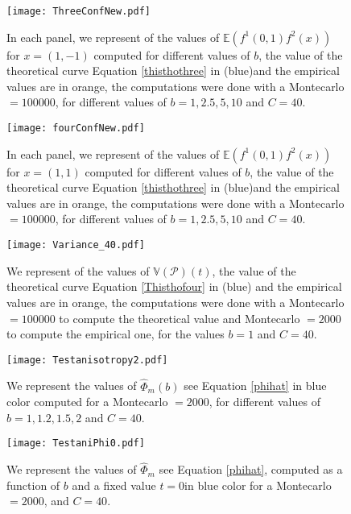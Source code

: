 \documentclass[12pt]{article}
\renewcommand{\hat}{\widehat}
\theoremstyle{Theorem}
\begin{document}
\begin{figure}[H]
  \centering
    {\texttt{[image: ThreeConfNew.pdf]}}
    \hspace{0.2cm}
 \caption{In each panel, we represent of the values of $\mathbb{E}\left(f^{1}(0,1)f^{2}(x)\right)$ for $x = (1,-1)$ computed for different values of $b$, the value of the theoretical curve Equation \eqref{thisthothree} in (blue)and the empirical values are in orange, the computations were done with a Montecarlo $= 100000$, for different values of $b = 1, 2.5, 5, 10$ and $C = 40$. }
\label{fig2}
\end{figure}

\begin{figure}[H]
  \centering
    {\texttt{[image: fourConfNew.pdf]}}
    \hspace{0.2cm}
 \caption{In each panel, we represent of the values of $\mathbb{E}\left(f^{1}(0,1)f^{2}(x)\right)$ for $x = (1, 1)$ computed for different values of $b$, the value of the theoretical curve Equation \eqref{thisthothree} in (blue)and the empirical values are in orange, the computations were done with a Montecarlo $= 100000$, for different values of $b = 1, 2.5, 5, 10$ and $C = 40$. }
\label{fig2}
\end{figure}

\begin{figure}[H]
  \centering
    {\texttt{[image: Variance\_40.pdf]}}
    \hspace{0.2cm}
 \caption{We represent of the values of $\mathbb{V}\left(\mathcal{P}\right)(t)$, the value of the theoretical curve Equation \eqref{Thisthofour} in (blue) and the empirical values are in orange, the computations were done with a Montecarlo $= 100000$ to compute the theoretical value and Montecarlo $= 2000$ to compute the empirical one, for the values $b = 1$ and $C = 40$. }
\label{fig2}
\end{figure}

\begin{figure}[H]
  \centering
    {\texttt{[image: Testanisotropy2.pdf]}}
    \hspace{0.2cm} 
 \caption{We represent the values of $\hat{\Phi}_{m}(b)$ see Equation \eqref{phihat} in blue color computed for a Montecarlo $= 2000$, for different values of $b = 1, 1.2, 1.5, 2$ and $C = 40$.}
\label{fig2}
\end{figure}

\begin{figure}[H]
  \centering
    {\texttt{[image: TestaniPhi0.pdf]}}
    \hspace{0.2cm} 
 \caption{We represent the values of $\hat{\Phi}_{m}$ see Equation \eqref{phihat}, computed as a function of $b$ and a fixed value $t=0$in blue color for a Montecarlo $= 2000$, and $C = 40$.}
\label{fig2}
\end{figure}
\end{document}
